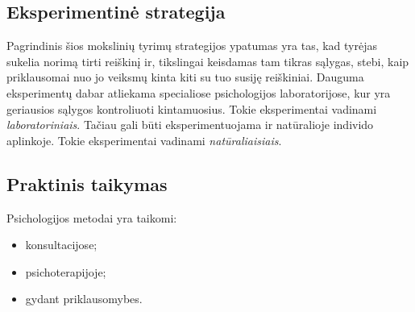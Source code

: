 \subsection{Eksperimentinė strategija}

Pagrindinis šios mokslinių tyrimų strategijos ypatumas yra tas, kad tyrėjas 
sukelia norimą tirti reiškinį ir, tikslingai keisdamas tam tikras sąlygas, 
stebi, kaip priklausomai nuo jo veiksmų kinta kiti su tuo susiję reiškiniai.
Dauguma eksperimentų dabar atliekama specialiose psichologijos 
laboratorijose, kur yra geriausios sąlygos kontroliuoti kintamuosius. Tokie 
eksperimentai vadinami \emph{laboratoriniais}. Tačiau gali būti 
eksperimentuojama ir natūralioje individo aplinkoje. Tokie eksperimentai 
vadinami \emph{natūraliaisiais}.

\subsection{Praktinis taikymas}

Psichologijos metodai yra taikomi:
\begin{itemize}
  \item konsultacijose;
  \item psichoterapijoje;
  \item gydant priklausomybes.
\end{itemize}
